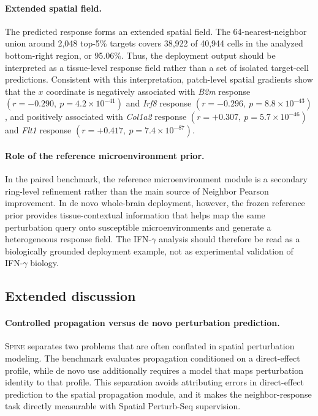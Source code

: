 \documentclass[sigconf,review,balance=false]{acmart}
\newcommand{\methodname}{\textsc{Spine}\xspace}
\begin{document}
\paragraph{Extended spatial field.}
The predicted response forms an extended spatial field. The 64-nearest-neighbor union around 2,048 top-5\% targets covers 38,922 of 40,944 cells in the analyzed bottom-right region, or 95.06\%. Thus, the deployment output should be interpreted as a tissue-level response field rather than a set of isolated target-cell predictions. Consistent with this interpretation, patch-level spatial gradients show that the $x$ coordinate is negatively associated with \textit{B2m} response $(r=-0.290,\ p=4.2\times10^{-41})$ and \textit{Irf8} response $(r=-0.296,\ p=8.8\times10^{-43})$, and positively associated with \textit{Col1a2} response $(r=+0.307,\ p=5.7\times10^{-46})$ and \textit{Flt1} response $(r=+0.417,\ p=7.4\times10^{-87})$.

\paragraph{Role of the reference microenvironment prior.}
In the paired benchmark, the reference microenvironment module is a secondary ring-level refinement rather than the main source of Neighbor Pearson improvement. In de novo whole-brain deployment, however, the frozen reference prior provides tissue-contextual information that helps map the same perturbation query onto susceptible microenvironments and generate a heterogeneous response field. The IFN-$\gamma$ analysis should therefore be read as a biologically grounded deployment example, not as experimental validation of IFN-$\gamma$ biology.

\subsection{Extended discussion}
\label{app:extended_discussion}

\paragraph{Controlled propagation versus de novo perturbation prediction.}
\methodname{} separates two problems that are often conflated in spatial perturbation modeling. The benchmark evaluates propagation conditioned on a direct-effect profile, while de novo use additionally requires a model that maps perturbation identity to that profile. This separation avoids attributing errors in direct-effect prediction to the spatial propagation module, and it makes the neighbor-response task directly measurable with Spatial Perturb-Seq supervision.
\end{document}
